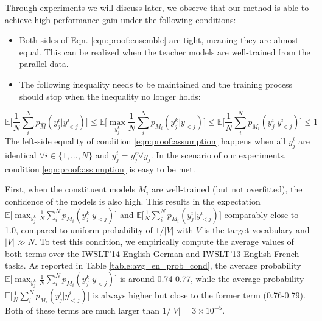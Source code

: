 \documentclass{article}
\newcommand{\E}{\mathbb{E}}
\begin{document}
Through experiments we will discuss later, we observe that our method is able to achieve high performance gain under the following conditions:
\begin{itemize}
    \item Both sides of Eqn. \ref{eqn:proof:ensemble} are tight, meaning they are almost equal. This can be realized when the teacher models are well-trained from the parallel data.
    \item The following inequality needs to be maintained and the training process should stop when the inequality no longer holds:
\end{itemize}
\begin{equation}
    \E\Big[ \frac{1}{N}\sum_i^N p_{\hat{M}}(y^i_j|y_{<j}^i) \Big] \leq \E \Big[ \max_{y_j^k}\frac{1}{N}\sum_i^N p_{M_i}(y^k_j|y_{<j}) \Big] \leq \E\Big[ \frac{1}{N}\sum_i^N p_{M_i}(y^i_j|y_{<j}^i) \Big] \leq 1 \label{eqn:proof:assumption}
\end{equation}
The left-side equality of condition \ref{eqn:proof:assumption} happens when all $y^i_j$ are identical $\forall i \in \{1,...,N\}$ and $y^i_j= y^e_j \forall y_j$.
In the scenario of our experiments, condition \ref{eqn:proof:assumption} is easy to be met. 

First, when the constituent models $M_{i}$ are well-trained (but not overfitted), the confidence of the models is also high. This results in the expectation $\E\Big[\max_{y_j^k}\frac{1}{N}\sum_i^N p_{M_i}(y^k_j|y_{<j})\Big]$ and $\E\Big[ \frac{1}{N}\sum_i^N p_{M_i}(y^i_j|y_{<j}^i) \Big]$ comparably close to 1.0, compared to uniform probability of $1/|V|$ with $V$ is the target vocabulary and $|V|\gg N$. To test this condition, we empirically compute the average values of both terms over the IWSLT'14 English-German and IWSLT'13 English-French tasks. As reported in Table \ref{table:avg_en_prob_cond}, the average probability $\E\Big[\max_{y_j^k}\frac{1}{N}\sum_i^N p_{M_i}(y^k_j|y_{<j})\Big]$ is around 0.74-0.77, while the average probability $\E\Big[ \frac{1}{N}\sum_i^N p_{M_i}(y^i_j|y_{<j}^i) \Big]$ is always higher but close to the former term (0.76-0.79). Both of these terms are much larger than $1/|V| = 3\times 10^{-5}$. 
\end{document}
